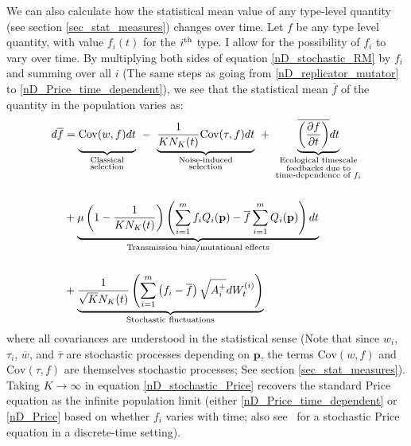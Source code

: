 We can also calculate how the statistical mean value of any type-level quantity (see section \ref{sec_stat_measures}) changes over time. Let $f$ be any type level quantity, with value $f_i(t)$ for the $i\textsuperscript{th}$ type. I allow for the possibility of $f_i$ to vary over time. By multiplying both sides of
equation \eqref{nD_stochastic_RM} by $f_i$ and summing over all $i$ (The same steps as going from \eqref{nD_replicator_mutator} to \eqref{nD_Price_time_dependent}), we see that the statistical mean $\overline{f}$ of the quantity in the population varies as:
\begin{equation}
\label{nD_stochastic_Price}
\begin{aligned}
d\overline{f} &= {\underbrace{\vphantom{ \frac{1}{KN_K(t)} }\textrm{Cov}(w,f)dt}_{\substack{\text{Classical} \\ \text{selection}}}} \ - \ {\underbrace{\frac{1}{KN_K(t)}\textrm{Cov}(\tau,f)dt}_{\substack{\text{Noise-induced} \\ \text{selection}}}} \ +  \  {\underbrace{\vphantom{ \frac{1}{KN_K(t)} }\overline{\left(\frac{\partial f}{\partial t}\right)}dt}_{\substack{\text{Ecological timescale} \\ \text{feedbacks due to} \\ \text{time-dependence of $f_i$}}}}\\[15pt]
&+ \underbrace{\mu\left(1-\frac{1}{KN_K(t)}\right)\left(\sum\limits_{i=1}^{m}f_iQ_i(\mathbf{p}) - \overline{f}\sum\limits_{i=1}^{m}Q_i(\mathbf{p})\right)dt}_{\text{Transmission bias/mutational effects}}\\[15pt]
&+ \underbrace{\frac{1}{\sqrt{K}N_{K}(t)}\left(\sum\limits_{i=1}^{m}\left(f_i-\overline{f}\right)\sqrt{A_i^+}dW_{t}^{(i)}\right)}_{\text{Stochastic fluctuations}}
\end{aligned} 
\end{equation}
where all covariances are understood in the statistical sense (Note that since $w_i$, $\tau_i$, $\overline{w}$, and $\overline{\tau}$ are stochastic processes depending on $\mathbf{p}$, the terms $\textrm{Cov}(w,f)$ and $\textrm{Cov}(\tau,f)$ are themselves stochastic processes; See section \ref{sec_stat_measures}). Taking $K \to \infty$ in equation \eqref{nD_stochastic_Price} recovers the standard Price equation as the infinite population limit (either \eqref{nD_Price_time_dependent} or \eqref{nD_Price} based on whether $f_i$ varies with time; also see~\cite{rice_universal_2020} for a stochastic Price equation in a discrete-time setting).

